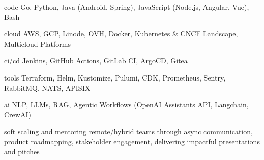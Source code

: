 
\begin{cvskills}

  \cvskill
    {code}
    {Go, Python, Java (Android, Spring), JavaScript (Node.js, Angular, Vue), Bash}

  \cvskill
    {cloud}
    {AWS, GCP, Linode, OVH, Docker, Kubernetes \& CNCF Landscape, Multicloud Platforms}

  \cvskill
    {ci/cd}
    {Jenkins, GitHub Actions, GitLab CI, ArgoCD, Gitea}

  \cvskill
    {tools}
    {Terraform, Helm, Kustomize, Pulumi, CDK, Prometheus, Sentry, RabbitMQ, NATS, APISIX}

  \cvskill
    {ai}
    {NLP, LLMs, RAG, Agentic Workflows (OpenAI Assistants API, Langchain, CrewAI)}

  \cvskill
    {soft}
    {scaling and mentoring remote/hybrid teams through async communication, product roadmapping, stakeholder engagement, delivering impactful presentations and pitches}

\end{cvskills}

